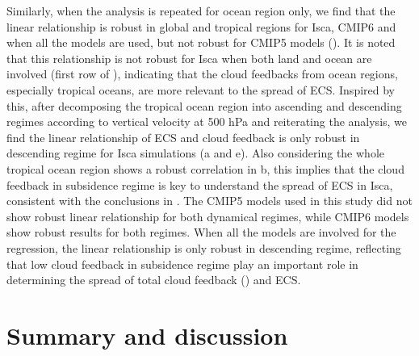 Similarly, when the analysis is repeated for ocean region only, we find that the linear relationship is robust in global and tropical regions for Isca, CMIP6 and when all the models are used, but not robust for CMIP5 models (). It is noted that this relationship is not robust for Isca when both land and ocean are involved (first row of ), indicating that the cloud feedbacks from ocean regions, especially tropical oceans, are more relevant to the spread of ECS. Inspired by this, after decomposing the tropical ocean region into ascending and descending regimes according to vertical velocity at 500 hPa \citep{Bony2004,Bony2005} and reiterating the analysis, we find the linear relationship of ECS and cloud feedback is only robust in descending regime for Isca simulations (a and e). Also considering the whole tropical ocean region shows a robust correlation in b, this implies that the cloud feedback in subsidence regime is key to understand the spread of ECS in Isca, consistent with the conclusions in . The CMIP5 models used in this study did not show robust linear relationship for both dynamical regimes, while CMIP6 models show robust results for both regimes. When all the models are involved for the regression, the linear relationship is only robust in descending regime, reflecting that low cloud feedback in subsidence regime play an important role in determining the spread of total cloud feedback () and ECS.


\section{Summary and discussion}


